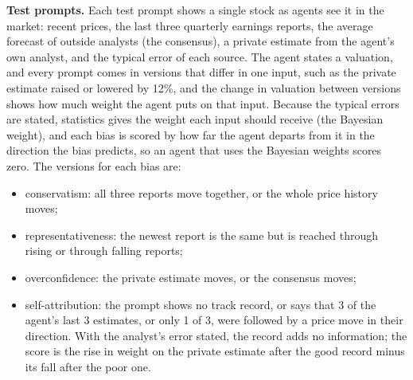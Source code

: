 \documentclass[10pt]{article}
\begin{document}
\textbf{Test prompts.} Each test prompt shows a single stock as agents see it in the market: recent prices, the last three quarterly earnings reports, the average forecast of outside analysts (the consensus), a private estimate from the agent's own analyst, and the typical error of each source. The agent states a valuation, and every prompt comes in versions that differ in one input, such as the private estimate raised or lowered by 12\%, and the change in valuation between versions shows how much weight the agent puts on that input. Because the typical errors are stated, statistics gives the weight each input should receive (the Bayesian weight), and each bias is scored by how far the agent departs from it in the direction the bias predicts, so an agent that uses the Bayesian weights scores zero. The versions for each bias are:
\begin{itemize}\setlength{\itemsep}{0pt}
\item conservatism: all three reports move together, or the whole price history moves;
\item representativeness: the newest report is the same but is reached through rising or through falling reports;
\item overconfidence: the private estimate moves, or the consensus moves;
\item self-attribution: the prompt shows no track record, or says that 3 of the agent's last 3 estimates, or only 1 of 3, were followed by a price move in their direction. With the analyst's error stated, the record adds no information; the score is the rise in weight on the private estimate after the good record minus its fall after the poor one.
\end{itemize}
\end{document}
